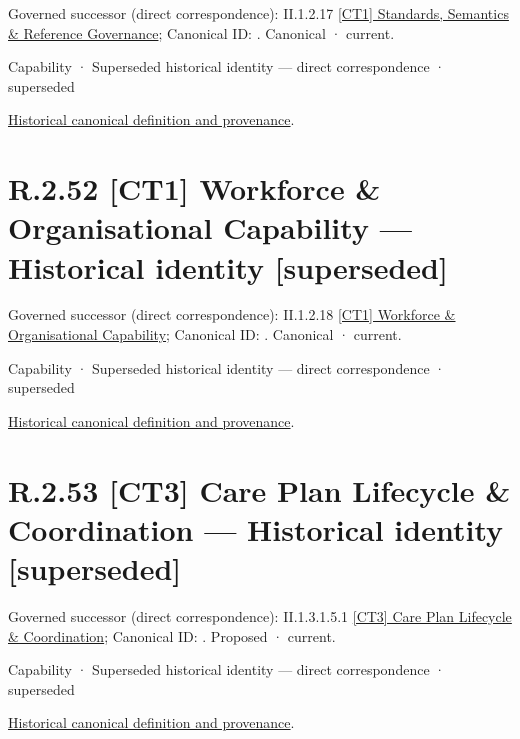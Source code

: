 {\small Governed successor (direct correspondence): II.1.2.17 \hyperref[element:5ffeb7401d314f06b05d79c3aff98242]{[CT1] Standards, Semantics \& Reference Governance}; Canonical ID: \texttt{}. Canonical · current.}\par
\label{element:3b65a3d007f54aa9b875e655475e1786}
{\small Capability · Superseded historical identity — direct correspondence · superseded}\par
\href{../../../../../../../continuum/strategy/capability/3b65a3d007f54aa9b875e655475e1786.md}{Historical canonical definition and provenance}.\par
\section*{R.2.52 [CT1] Workforce \& Organisational Capability — Historical identity [superseded]}
\label{navigation:R.2.52}

{\small Governed successor (direct correspondence): II.1.2.18 \hyperref[element:631b43664bfb4c50ac8cf4958b2c347d]{[CT1] Workforce \& Organisational Capability}; Canonical ID: \texttt{}. Canonical · current.}\par
\label{element:b1161fe1a315420fbc7d048a1ea58126}
{\small Capability · Superseded historical identity — direct correspondence · superseded}\par
\href{../../../../../../../continuum/strategy/capability/b1161fe1a315420fbc7d048a1ea58126.md}{Historical canonical definition and provenance}.\par
\section*{R.2.53 [CT3] Care Plan Lifecycle \& Coordination — Historical identity [superseded]}
\label{navigation:R.2.53}

{\small Governed successor (direct correspondence): II.1.3.1.5.1 \hyperref[element:4cb7db65392f4fab801d7794af4d4b29]{[CT3] Care Plan Lifecycle \& Coordination}; Canonical ID: \texttt{}. Proposed · current.}\par
\label{element:689bb3f8a24249b79f787e1f48eb268d}
{\small Capability · Superseded historical identity — direct correspondence · superseded}\par
\href{../../../../../../../continuum/strategy/capability/689bb3f8a24249b79f787e1f48eb268d.md}{Historical canonical definition and provenance}.\par
